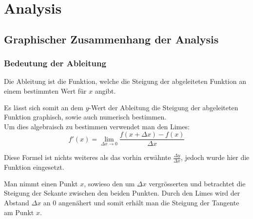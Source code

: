 \documentclass[a4paper,11pt]{report}
\begin{document}
\begin{titlepage}
    {\newUpperTitleFont\thetitle\par}
    \vspace{1cm}

    {\theauthor\par}
    \vspace{.5cm}

    {\thedate\par}
    \vspace{5cm}

\end{titlepage}
\part{Analysis}
\chapter{Graphischer Zusammenhang der Analysis}
\section{Bedeutung der Ableitung}
Die Ableitung ist die Funktion, welche die Steigung der abgeleiteten Funktion an einem bestimmten Wert für $x$ angibt. 

Es lässt sich somit an dem $y$-Wert der Ableitung die Steigung der abgeleiteten Funktion graphisch, sowie auch numerisch bestimmen.\\

Um dies algebraisch zu bestimmen verwendet man den Limes:
\begin{equation}
    f'(x) = \lim_{\Delta x \to 0} \frac{f(x+\Delta x)-f(x)}{\Delta x}
\end{equation}

Diese Formel ist nichts weiteres als das vorhin erwähnte $\frac{\Delta y}{\Delta x}$, jedoch wurde hier die Funktion eingesetzt.

Man nimmt einen Punkt $x$, sowieso den um $\Delta x$ vergrösserten und betrachtet die Steigung der Sekante zwischen den beiden Punkten. Durch den Limes wird der Abstand $\Delta x$ an 0 angenähert und somit erhält man die Steigung der Tangente am Punkt $x$.
\begin{center}
\end{center}
\end{document}
